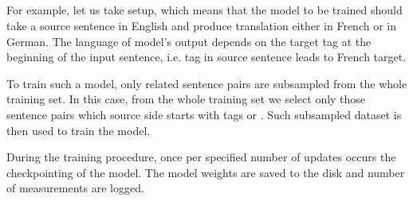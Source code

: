 

\subsection{}
\label{section:data_selection}



\subsection{}
\label{section:training_tasks}



\subsection{}

For example, let us take  setup, which means that
the model to be trained should take a source sentence in English and
produce translation either in French or in German.
The language of model's output depends on the target tag at the beginning
of the input sentence, i.e.  tag in source sentence leads to French
target.

To train such a model, only related sentence pairs are subsampled
from the whole training set.
In this case, from the whole training set we select only those sentence
pairs which source side starts with tags  or .
Such subsampled dataset is then used to train the model.

During the training procedure, once per specified number of updates
occurs the checkpointing of the model.
The model weights are saved to the disk and number of measurements are logged.


